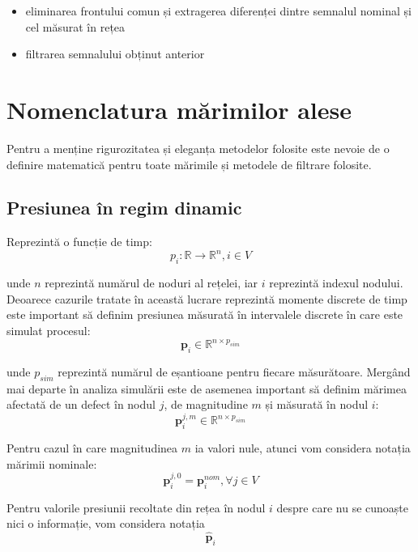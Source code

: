 \begin{itemize}
\item eliminarea frontului comun și extragerea diferenței dintre semnalul nominal și cel măsurat în rețea
\item filtrarea semnalului obținut anterior
\end{itemize}

\section{Nomenclatura mărimilor alese}
\label{sec:nomenclatura}
Pentru a menține rigurozitatea și eleganța metodelor folosite este nevoie de o definire matematică pentru toate mărimile și metodele de filtrare folosite.

\subsection{Presiunea în regim dinamic}
Reprezintă o funcție de timp:
\begin{equation}
p_i : \mathbb{R} \longrightarrow \mathbb{R}^n, i \in V
\label{eq:press:func}
\end{equation}

unde $n$ reprezintă numărul de noduri al rețelei, iar $i$ reprezintă indexul nodului. 
Deoarece cazurile tratate în această lucrare reprezintă momente discrete de timp este important să definim presiunea măsurată în intervalele discrete în care este simulat procesul:
\begin{equation}
\mathbf{p}_i \in \mathbb{R}^{n \times p_{sim}}
\end{equation}

unde $p_{sim}$ reprezintă numărul de eșantioane pentru fiecare măsurătoare. Mergând mai departe în analiza simulării este de asemenea important să definim mărimea afectată de un defect în nodul $j$, de magnitudine $m$ și măsurată în nodul $i$:
\begin{equation}
\mathbf{p}^{j,m}_i \in \mathbb{R}^{n \times p_{sim}}
\end{equation}

Pentru cazul în care magnitudinea $m$ ia valori nule, atunci vom considera notația mărimii nominale:
\begin{equation}
\mathbf{p}^{j,0}_i = \mathbf{p}^{nom}_i, \forall j \in V
\end{equation}

Pentru valorile presiunii recoltate din rețea în nodul $i$ despre care nu se cunoaște nici o informație, vom considera notația
\begin{equation}
\widehat{\mathbf{p}}_i
\end{equation}

